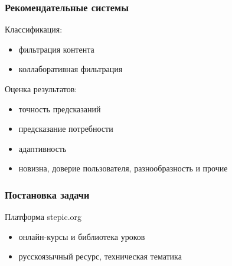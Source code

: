 \documentclass{beamer}
\begin{document}
\begin{frame}\frametitle{Рекомендательные системы} 
    
    Классификация\cite{rec_sys_handbook}:
    \begin{itemize}
    	\item фильтрация контента
    	\item коллаборативная фильтрация    %
    \end{itemize}
    
    \bigskip
    
    Оценка результатов\cite{rec_sys_handbook:evaluation}:   %
    \begin{itemize}
    	\item точность предсказаний     %
    	\item предсказание потребности  %
    	\item адаптивность      %
    	\item новизна, доверие пользователя, разнообразность и прочие
    \end{itemize}
\end{frame}



\begin{frame}\frametitle{Постановка задачи}
Платформа stepic.org
    \begin{itemize}
    	\item онлайн-курсы и библиотека уроков
    	\item русскоязычный ресурс, техническая тематика
    \end{itemize}

\bigskip

\begin{figure}[H]
\end{figure}
    

\end{frame}
\end{document}
